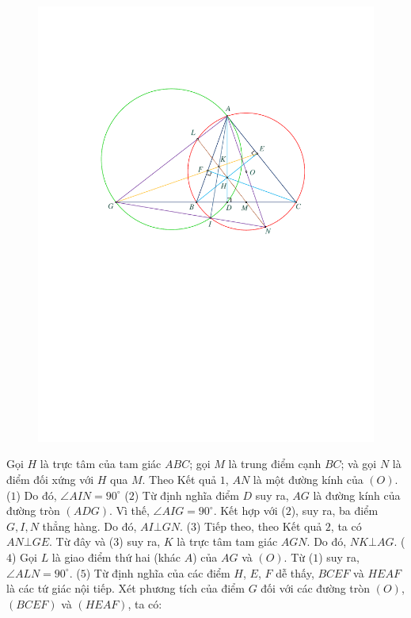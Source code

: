 \begin{multicols}{2}
\begin{figure}[H]
		\includegraphics[width= 0.99\linewidth]{P595a}
		\vspace*{-10pt}
	\end{figure}
	Gọi $H$ là trực tâm của tam giác $ABC$; gọi $M$ là trung điểm cạnh $BC$; và gọi $N$ là điểm đối xứng với $H$ qua $M$.
	\vskip 0.05cm
	Theo Kết quả $1$, $AN$ là một đường kính của $(O)$.  \hfill   ($1$)
	\vskip 0.05cm
	Do đó, $\angle AIN = 90^\circ$ \hfill ($2$)
	\vskip 0.05cm
	Từ định nghĩa điểm $D$ suy ra, $AG$ là đường kính của đường tròn $(ADG)$. Vì thế, $\angle AIG = 90^\circ$.  Kết hợp với ($2$), suy ra, ba điểm $G, I, N$ thẳng hàng. Do đó, $AI \bot GN$. \hfill  ($3$)
	\vskip 0.05cm
	Tiếp theo, theo Kết quả $2$, ta có $AN \bot GE$. Từ đây và ($3$) suy ra, $K$ là trực tâm tam giác $AGN$. Do đó, $NK \bot AG$. \hfill ($4$)
	\vskip 0.05cm
	Gọi $L$ là giao điểm thứ hai (khác $A$) của $AG$  và $(O)$. Từ ($1$) suy ra, $\angle ALN = 90^\circ$. \hfill  ($5$)
	\vskip 0.05cm
	Từ định nghĩa của các điểm $H$, $E$, $F$ dễ thấy, $BCEF$ và $HEAF$ là các tứ giác nội tiếp. Xét phương tích của điểm $G$ đối với các đường tròn $(O)$, $(BCEF)$ và $(HEAF)$, ta có:

\end{multicols}
